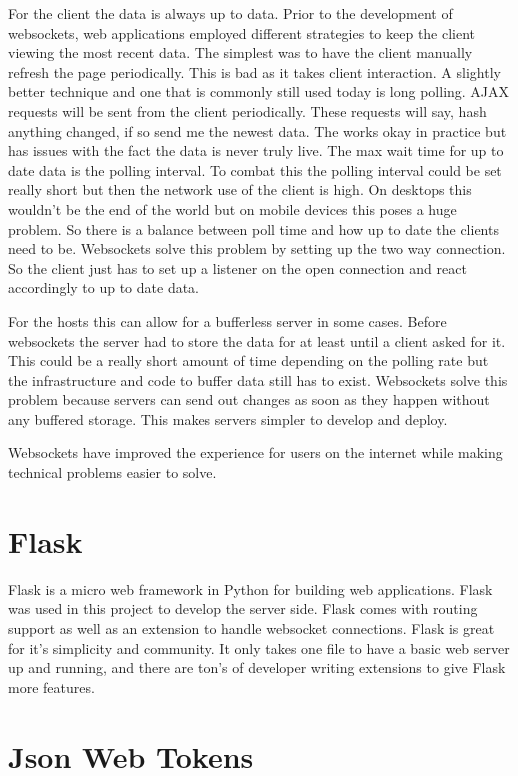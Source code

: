 For the client the data is always up to data. Prior to the development of websockets, web applications employed different strategies to keep the client viewing the most recent data. The simplest was to have the client manually refresh the page periodically. This is bad as it takes client interaction. A slightly better technique and one that is commonly still used today is long polling. AJAX requests will be sent from the client periodically. These requests will say, hash anything changed, if so send me the newest data. The works okay in practice but has issues with the fact the data is never truly live. The max wait time for up to date data is the polling interval. To combat this the polling interval could be set really short but then the network use of the client is high. On desktops this wouldn’t be the end of the world but on mobile devices this poses a huge problem. So there is a balance between poll time and how up to date the clients need to be. Websockets solve this problem by setting up the two way connection. So the client just has to set up a listener on the open connection and react accordingly to up to date data.


For the hosts this can allow for a bufferless server in some cases. Before websockets the server had to store the data for at least until a client asked for it. This could be a really short amount of time depending on the polling rate but the infrastructure and code to buffer data still has to exist. Websockets solve this problem because servers can send out changes as soon as they happen without any buffered storage. This makes servers simpler to develop and deploy.


Websockets have improved the experience for users on the internet while making technical problems easier to solve.


\section{Flask}


Flask is a micro web framework in Python for building web applications. \cite{flask}
Flask was used in this project to develop the server side. Flask comes with routing support as well as an extension to handle websocket connections. Flask is great for it’s simplicity and community. It only takes one file to have a basic web server up and running, and there are ton’s of developer writing extensions to give Flask more features.


\section{Json Web Tokens}


